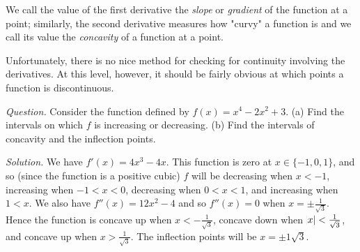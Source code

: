 We call the value of the first derivative the \textit{slope} or \textit{gradient} of the function at a point; similarly,
the second derivative measures how "curvy" a function is and we call its value the \textit{concavity} of a function
at a point.

Unfortunately, there is no nice method for checking for continuity involving the derivatives. At this level, however, it
should be fairly obvious at which points a function is discontinuous.

\begin{ex}
  \textit{Question.} Consider the function defined by $ f(x) = x^4 - 2x^2 + 3 $. (a) Find the intervals on which $ f $
  is increasing or decreasing. (b) Find the intervals of concavity and the inflection points.

  \textit{Solution.} We have $ f'(x) = 4x^3 - 4x $. This function is zero at $ x \in \{-1, 0, 1\} $, and so (since the function
  is a positive cubic) $ f $ will be decreasing when $ x < -1 $, increasing when $ -1 < x < 0 $, decreasing when $ 0 < x < 1 $,
  and increasing when $ 1 < x $. We also have $ f''(x) = 12x^2 - 4 $ and so $ f''(x) = 0 $ when $ x = \pm \frac{1}{\sqrt{3}} $.
  Hence the function is concave up when $ x < -\frac{1}{\sqrt{3}} $, concave down when $ \abs{x} < \frac{1}{\sqrt{3}} $, and concave
  up when $ x > \frac{1}{\sqrt{3}} $. The inflection points will be $ x = \pm{1}{\sqrt{3}} $.
  \begin{center}
  \end{center}
\end{ex}

\clearpage
